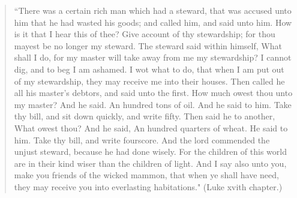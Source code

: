 \begin{verse}
``There was a certain rich man which had a steward, that was accused
unto him that he had wasted his goods; and called him, and said unto him. How 
is it that I hear this of thee? Give account of thy stewardship; for thou 
mayest be no longer my steward. The steward said within himself, What shall 
I do, for my master will take away from me my stewardship? I cannot dig, and 
to beg I am ashamed. I wot what to do, that when I am put out of my
stewardship, they may receive me into their houses. Then called he all his master's 
debtors, and said unto the first. How much owest thou unto my master? And 
he said. An hundred tons of oil. And he said to him. Take thy bill, and sit 
down quickly, and write fifty. Then said he to another, What owest thou? 
And he said, An hundred quarters of wheat. He said to him. Take thy bill, and 
write fourscore. And the lord commended the unjust steward, because he had 
done wisely. For the children of this world are in their kind wiser than the 
children of light. And I say also unto you, make you friends of the wicked 
mammon, that when ye shall have need, they may receive you into everlasting 
habitations." (Luke xvith chapter.) 
\end{verse}

